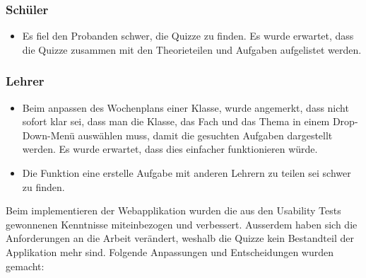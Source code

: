 \subsubsection*{Schüler}
\begin{itemize}
	\item Es fiel den Probanden schwer, die Quizze zu finden. Es wurde erwartet, dass die Quizze zusammen mit den Theorieteilen und Aufgaben aufgelistet werden.
\end{itemize}

\subsubsection*{Lehrer}
\begin{itemize}
	\item Beim anpassen des Wochenplans einer Klasse, wurde angemerkt, dass nicht sofort klar sei, dass man die Klasse, das Fach und das Thema in einem Drop-Down-Menü auswählen muss, damit die gesuchten Aufgaben dargestellt werden. Es wurde erwartet, dass dies einfacher funktionieren würde.
	\item Die Funktion eine erstelle Aufgabe mit anderen Lehrern zu teilen sei schwer zu finden.
\end{itemize}

Beim implementieren der Webapplikation wurden die aus den Usability Tests gewonnenen Kenntnisse miteinbezogen und verbessert. Ausserdem haben sich die Anforderungen an die Arbeit verändert, weshalb die Quizze kein Bestandteil der Applikation mehr sind. Folgende Anpassungen und Entscheidungen wurden gemacht: \\


